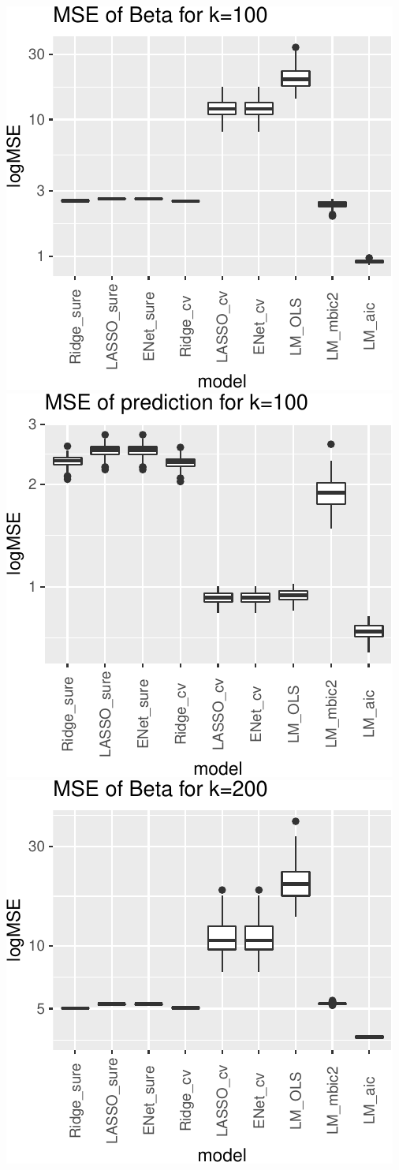 \documentclass[
]{article}
\begin{document}
\includegraphics[width=0.8\linewidth]{report_files/figure-latex/unnamed-chunk-10-3}
\includegraphics[width=0.8\linewidth]{report_files/figure-latex/unnamed-chunk-10-4}
\includegraphics[width=0.8\linewidth]{report_files/figure-latex/unnamed-chunk-10-5}
\end{document}
